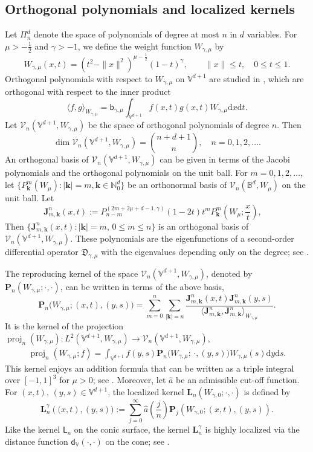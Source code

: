 \documentclass{amsart}
\theoremstyle{remark}
\def\la{{\langle}}
\def\ra{{\rangle}}
\def\d{\mathrm{d}}
\def\g{{\gamma}}
\def\la{{\langle}}
\def\ra{{\rangle}}
\def\kb{{\mathbf k}}
\def\Lb{{\mathbf L}}
\def\Pb{{\mathbf P}}
\def\CV{{\mathcal V}}
\def\BB{{\mathbb B}}
\def\NN{{\mathbb N}}
\def\VV{{\mathbb V}}
\def\proj{\operatorname{proj}}
\def\la{{\langle}}
\def\ra{{\rangle}}
\def\d{\mathrm{d}}
\def\sL{{\mathsf L}}
\def\sb{{\mathsf b}}
\def\sd{{\mathsf d}}
\def\fD{{\mathfrak D}}
\def\g{{\gamma}}
\def\la{{\langle}}
\def\ra{{\rangle}}
\def\kb{{\mathbf k}}
\def\Jb{{\mathbf J}}
\def\Lb{{\mathbf L}}
\def\Pb{{\mathbf P}}
\def\CV{{\mathcal V}}
\def\BB{{\mathbb B}}
\def\NN{{\mathbb N}}
\def\VV{{\mathbb V}}
\def\proj{\operatorname{proj}}
\newcommand{\wh}{\widehat}
\def\fD{{\mathfrak D}}
\def\f{\frac}
\def\f{\frac}
\begin{document}
\subsection{Orthogonal polynomials and localized kernels}\label{sec:OPcone}
Let $\Pi_n^d$ denote the space of polynomials of degree at most $n$ in $d$ variables. For $\mu > -\f12$ 
and $\g > -1$, we define the weight function $W_{\g,\mu}$ by
\begin{equation}\label{weightcone}
	W_{\g,\mu}(x,t) = (t^2-\|x\|^2)^{\mu-\f12} (1-t)^\g, \qquad \|x\| \le t, \quad 0 \le t \le 1. 
\end{equation}
Orthogonal polynomials with respect to $W_{\g,\mu}$ on $\VV^{d+1}$ are studied in \cite{X20}, which are 
orthogonal with respect to the inner product 
$$
\la f, g\ra_{W_{\g,\mu}} =\sb_{\g,\mu} \int_{\VV^{d+1}} f(x,t) g(x,t) W_{\g,\mu} \d x \d t.
$$ 
Let $\CV_n(\VV^{d+1},W_{\g,\mu})$ be the space of orthogonal polynomials of degree $n$. Then 
$$
\dim \CV_n(\VV^{d+1},W_{\g,\mu})  = \binom{n+d+1}{n}, \quad n=0, 1,2,\ldots.
$$
An orthogonal basis of $\CV_n(\VV^{d+1}, W_{\g,\mu})$ can be given in terms of the Jacobi polynomials 
and the orthogonal polynomials on the unit ball. For $m =0,1,2,\ldots$, let $\{P_\kb^m(W_\mu): |\kb| = m, 
\kb \in \NN_0^d\}$ be an orthonormal basis of $\CV_n(\BB^d, W_\mu)$ on the unit ball. Let
\begin{equation} \label{eq:coneJ}
	\Jb_{m,\kb}^n(x,t):= P_{n-m}^{(2m+2\mu+d-1, \g)}(1- 2t) t^m P_\kb^m\left(W_\mu; \frac{x}{t}\right), \quad 
\end{equation}
Then $\{\Jb_{m,\kb}^n(x,t): |\kb| = m, \, 0 \le m\le n\}$ is an orthogonal basis of $\CV_n(\VV^{d+1},W_{\g,\mu})$.
These polynomials are the eigenfunctions of a second-order differential operator $\fD_{\g,\mu}$ with the eigenvalues 
depending only on the degree; see \cite[Theorem 3.2]{X20}.  
 
The reproducing kernel of the space $\CV_n(\VV^{d+1}, W_{\g,\mu})$, denoted by $\Pb_n(W_{\g,\mu};\cdot,\cdot)$, 
can be written in terms of the above basis, 
$$
\Pb_n\big(W_{\g,\mu}; (x,t),(y,s) \big) = \sum_{m=0}^n \sum_{|\kb|=n} 
\frac{  \Jb_{m, \kb}^n(x,t)  \Jb_{m, \kb}^n(y,s)}{\la  \Jb_{m, \kb}^n,  \Jb_{m, \kb}^n \ra_{W_{\g,\mu}}}.
$$
It is the kernel of the projection $\proj_n(W_{\g,\mu}): L^2(\VV^{d+1},W_{\g,\mu}) \to 
\CV_n(\VV^{d+1}, W_{\g,\mu})$, 
\begin{align}\label{sc-proj}
	\proj_n(W_{\g,\mu};f) = \int_{\VV^{d+1}} f(y,s) \Pb_n\big(W_{\g,\mu}; \,\cdot, (y,s) \big)  W_{\g,\mu}(s) \d y \d s.
\end{align}
This kernel enjoys an addition formula that can be written as a triple integral over $[-1,1]^3$ for $\mu > 0$; see 
\cite[Theorem 4.3]{X20}. Moreover, let $\wh a$ be an admissible cut-off function.  For $(x,t), \, (y,s) \in \VV^{d+1}$, 
the localized kernel $\Lb_n(W_{\g,0}; \cdot,\cdot)$ is defined by  
$$
\Lb_n^\g (\big (x,t),(y,s)\big) := \sum_{j=0}^\infty \wh a\left( \frac{j}{n} \right)
\Pb_j\left(W_{\g,0}; (x,t), (y,s)\right). 
$$
Like the kernel $\sL_n$ on the conic surface, the kernel $\Lb_n^\g$ is highly localized via the distance 
function $\sd_{\VV}(\cdot, \cdot)$ on the cone; see  \cite[Theorem 5.9]{X21}. 
\end{document}
